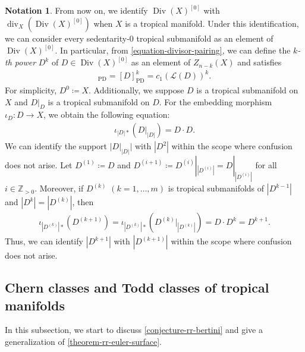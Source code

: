 \documentclass[a4paper,dvipdfmx,reqno,12pt]{amsart}
\theoremstyle{definition}
\newtheorem{notation}[theorem]{Notation}
\newcommand{\deq}{\coloneqq}
\newcommand{\opn}[1]{\operatorname{#1}}
\newcommand{\PD}[1]{[#1]_{\mathrm{PD}}}
\numberwithin{equation}{section}
\begin{document}
\begin{notation}
\label{notation-power-divisor}
From now on, we identify
$\opn{Div}(X)^{[0]}$ with 
$\opn{div}_X(\opn{Div}(X)^{[0]})$
when $X$ is a tropical manifold.
Under this identification,
we can consider every sedentarity-0 tropical
submanifold as an element of $\opn{Div}(X)^{[0]}$.
In particular, from \cref{equation-divisor-pairing},
we can define the \emph{$k$-th power}
$D^{k}$ of $D\in \opn{Div}(X)^{[0]}$ as an element
of $Z_{n-k}(X)$ and satisfies
\begin{align}
\PD{D^{k}}=\PD{D}^{k}=c_1(\mathcal{L}(D))^{k}.
\end{align}
For simplicity, $D^{0}\deq X$.
Additionally, we suppose $D$ is a tropical submanifold on $X$
and $D|_{D}$ is a tropical submanifold on $D$.
For the embedding morphism $\iota_{D}\colon D\to X$,
we obtain the following equation:
\begin{align}
\iota_{|D|*}(D|_{|D|})=D\cdot D.
\end{align}
We can identify the support $|D|_{|D|}|$ with $|D^2|$ 
within the scope where confusion does not arise.
Let $D^{(1)}\deq D$ and $D^{(i+1)}\deq 
D^{(i)}|_{|D^{(i)}|}=D|_{|D^{(i)}|}$ for all
$i\in \mathbb{Z}_{>0}$. 
Moreover, if $D^{(k)}$ $(k=1,\ldots,m)$ is
tropical submanifolds of $|D^{k-1}|$
and $|D^{k}|=|D^{(k)}|$, then
\begin{align}
\iota_{|D^{(k)}|*}(D^{(k+1)})=
\iota_{|D^{(k)}|*}(D^{(k)}|_{|D^{(k)}|})
=D\cdot D^{k}=D^{k+1}.
\end{align}
Thus, we can identify 
$|D^{k+1}|$ with $|D^{(k+1)}|$
within the scope where confusion does not arise.
\end{notation}






\subsection{Chern classes and Todd classes of
tropical manifolds}
In this subsection, we start to discuss
\cref{conjecture-rr-bertini} and give a generalization
of \cref{theorem-rr-euler-surface}.
\end{document}
